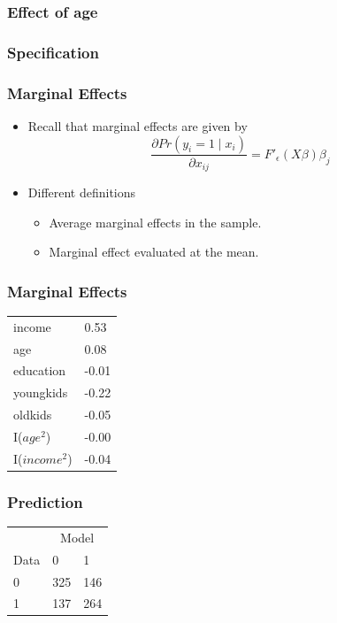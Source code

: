 \documentclass{beamer}
\newcommand{\1}{\mathbb{1}}
\begin{document}
\begin{frame}\frametitle{Effect of age}

\end{frame}

\begin{frame}\frametitle{Specification}

\end{frame}

\begin{frame}\frametitle{Marginal Effects}
\begin{itemize}
 \item Recall that marginal effects are given by \begin{equation}
\dfrac{\partial Pr(y_i=1 \mid x_i)}{\partial x_{ij}}  = F'_{\epsilon}(X\beta) \beta_j
\end{equation}
\item Different definitions
\begin{itemize}
 \item Average marginal effects in the sample.
 \item Marginal effect evaluated at the mean.
\end{itemize}

\end{itemize}

\end{frame}


\begin{frame}\frametitle{Marginal Effects}
\begin{table}[ht]
\centering
\begin{tabular}{ll}
  \hline
  \hline
  income & 0.53 \\ 
  age & 0.08 \\ 
  education & -0.01 \\ 
  youngkids & -0.22 \\ 
  oldkids & -0.05 \\ 
  I($age^2$) & -0.00 \\ 
  I($income^2$) & -0.04 \\ 
   \hline
\end{tabular}
\end{table}
\end{frame}

\begin{frame}\frametitle{Prediction}
\begin{table}[ht]
\centering
\begin{tabular}{lll}
  \hline
 & \multicolumn{2}{c}{Model}\\ 
Data & 0 & 1 \\ 
  \cline{2-3}
0 & 325 & 146 \\ 
  1 & 137 & 264 \\ 
   \hline
\end{tabular}
\end{table}
\end{frame}
\end{document}
